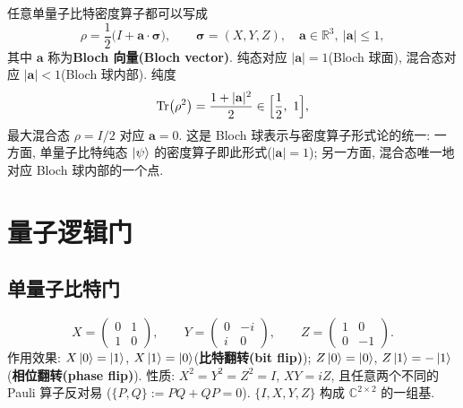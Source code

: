 \documentclass[utf8]{article} %
\numberwithin{equation}{section}   %
\newtheorem{Def}{\hskip 2em {\color{green} 定义}}[subsection]
\newtheorem{Note}{\hskip 2em {\color{red} 注}}[subsection]
\begin{document}
\begin{Note}
    任意单量子比特密度算子都可以写成
    \[ \rho = \frac{1}{2}\big(I + \mathbf{a}\cdot\boldsymbol{\sigma}\big), \qquad
    \boldsymbol{\sigma} = (X, Y, Z),\quad \mathbf{a} \in \mathbb{R}^3,\ |\mathbf{a}| \le 1, \]
    其中 $\mathbf{a}$ 称为\textbf{Bloch 向量(Bloch vector)}. 纯态对应 $|\mathbf{a}| = 1$(Bloch 球面),
    混合态对应 $|\mathbf{a}| < 1$(Bloch 球内部). 纯度
    \[ \Tr(\rho^2) = \frac{1 + |\mathbf{a}|^2}{2} \in \Big[\frac{1}{2},\ 1\Big], \]
    最大混合态 $\rho = I/2$ 对应 $\mathbf{a} = 0$. 这是 Bloch 球表示与密度算子形式论的统一:
    一方面, 单量子比特纯态 $\ket{\psi}$ 的密度算子即此形式($|\mathbf{a}| = 1$);
    另一方面, 混合态唯一地对应 Bloch 球内部的一个点.
\end{Note}

\section{量子逻辑门} \label{sec:gates}

\subsection{单量子比特门}

\begin{Def}[Pauli 门]
    \begin{equation}
        X = \begin{pmatrix} 0 & 1 \\ 1 & 0 \end{pmatrix}, \qquad
        Y = \begin{pmatrix} 0 & -i \\ i & 0 \end{pmatrix}, \qquad
        Z = \begin{pmatrix} 1 & 0 \\ 0 & -1 \end{pmatrix}.
    \end{equation}
    作用效果: $X\ket{0} = \ket{1}$, $X\ket{1} = \ket{0}$(\textbf{比特翻转(bit flip)});
    $Z\ket{0} = \ket{0}$, $Z\ket{1} = -\ket{1}$(\textbf{相位翻转(phase flip)}).
    性质: $X^2 = Y^2 = Z^2 = I$, $XY = iZ$, 且任意两个不同的 Pauli 算子反对易
    ($\{P, Q\} := PQ + QP = 0$). $\{I, X, Y, Z\}$ 构成 $\mathbb{C}^{2\times 2}$ 的一组基.
\end{Def}
\end{document}

